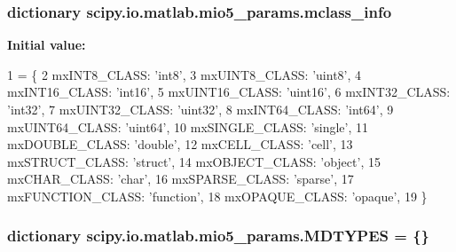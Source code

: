 \subsubsection[{mclass\+\_\+info}]{\setlength{\rightskip}{0pt plus 5cm}dictionary scipy.\+io.\+matlab.\+mio5\+\_\+params.\+mclass\+\_\+info}\label{namespacescipy_1_1io_1_1matlab_1_1mio5__params_af9b5207c0daee91d419d4774a7ad36e5}
{\bfseries Initial value\+:}
\begin{DoxyCode}
1 = \{
2     mxINT8\_CLASS: \textcolor{stringliteral}{'int8'},
3     mxUINT8\_CLASS: \textcolor{stringliteral}{'uint8'},
4     mxINT16\_CLASS: \textcolor{stringliteral}{'int16'},
5     mxUINT16\_CLASS: \textcolor{stringliteral}{'uint16'},
6     mxINT32\_CLASS: \textcolor{stringliteral}{'int32'},
7     mxUINT32\_CLASS: \textcolor{stringliteral}{'uint32'},
8     mxINT64\_CLASS: \textcolor{stringliteral}{'int64'},
9     mxUINT64\_CLASS: \textcolor{stringliteral}{'uint64'},
10     mxSINGLE\_CLASS: \textcolor{stringliteral}{'single'},
11     mxDOUBLE\_CLASS: \textcolor{stringliteral}{'double'},
12     mxCELL\_CLASS: \textcolor{stringliteral}{'cell'},
13     mxSTRUCT\_CLASS: \textcolor{stringliteral}{'struct'},
14     mxOBJECT\_CLASS: \textcolor{stringliteral}{'object'},
15     mxCHAR\_CLASS: \textcolor{stringliteral}{'char'},
16     mxSPARSE\_CLASS: \textcolor{stringliteral}{'sparse'},
17     mxFUNCTION\_CLASS: \textcolor{stringliteral}{'function'},
18     mxOPAQUE\_CLASS: \textcolor{stringliteral}{'opaque'},
19     \}
\end{DoxyCode}
\hypertarget{namespacescipy_1_1io_1_1matlab_1_1mio5__params_a116bbcaa432cfa9a2291e1985d33f97f}{}
\subsubsection[{M\+D\+T\+Y\+P\+E\+S}]{\setlength{\rightskip}{0pt plus 5cm}dictionary scipy.\+io.\+matlab.\+mio5\+\_\+params.\+M\+D\+T\+Y\+P\+E\+S = \{\}}\label{namespacescipy_1_1io_1_1matlab_1_1mio5__params_a116bbcaa432cfa9a2291e1985d33f97f}
\hypertarget{namespacescipy_1_1io_1_1matlab_1_1mio5__params_a155ba11a55a9e662d4dfae9ffb1763e1}{}
